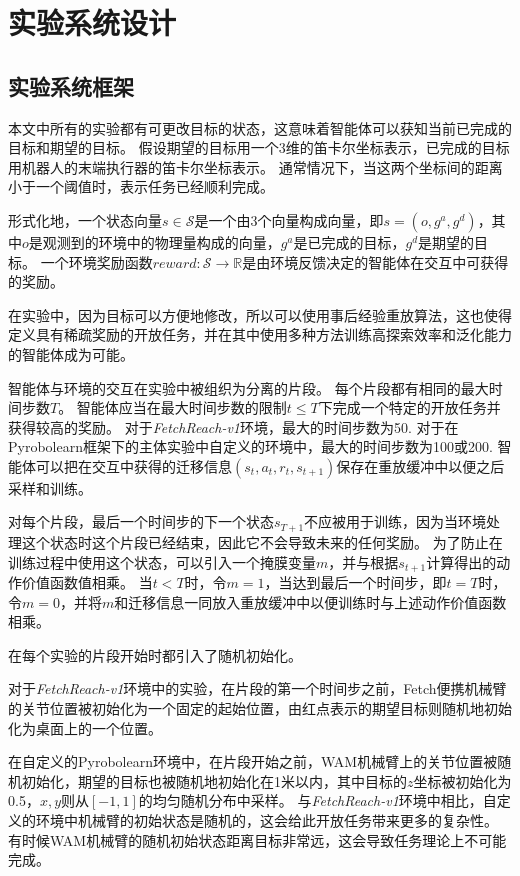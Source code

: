 
\chapter{实验系统设计}

\section{实验系统框架}\label{expframe}
本文中所有的实验都有可更改目标的状态，这意味着智能体可以获知当前已完成的目标和期望的目标。
假设期望的目标用一个3维的笛卡尔坐标表示，已完成的目标用机器人的末端执行器的笛卡尔坐标表示。
通常情况下，当这两个坐标间的距离小于一个阈值时，表示任务已经顺利完成。

形式化地，一个状态向量$s\in\mathcal S$是一个由3个向量构成向量，即$s=(o,g^a,g^d)$，其中$o$是观测到的环境中的物理量构成的向量，$g^a$是已完成的目标，$g^d$是期望的目标。
一个环境奖励函数$reward:\mathcal S\to \mathbb R$是由环境反馈决定的智能体在交互中可获得的奖励。

在实验中，因为目标可以方便地修改，所以可以使用事后经验重放算法，这也使得定义具有稀疏奖励的开放任务，并在其中使用多种方法训练高探索效率和泛化能力的智能体成为可能。

智能体与环境的交互在实验中被组织为分离的片段。
每个片段都有相同的最大时间步数$T$。
智能体应当在最大时间步数的限制$t\leq T$下完成一个特定的开放任务并获得较高的奖励。
对于\emph{FetchReach-v1}环境，最大的时间步数为50.
对于在Pyrobolearn框架下的主体实验中自定义的环境中，最大的时间步数为100或200.
智能体可以把在交互中获得的迁移信息$(s_t,a_t,r_t,s_{t+1})$保存在重放缓冲\cite{DBLP:journals/corr/abs-1906-05253}中以便之后采样和训练。

对每个片段，最后一个时间步的下一个状态$s_{T+1}$不应被用于训练，因为当环境处理这个状态时这个片段已经结束，因此它不会导致未来的任何奖励。
为了防止在训练过程中使用这个状态，可以引入一个掩膜变量$m$，并与根据$s_{t+1}$计算得出的动作价值函数值相乘。
当$t<T$时，令$m=1$，当达到最后一个时间步，即$t=T$时，令$m=0$，并将$m$和迁移信息一同放入重放缓冲中以便训练时与上述动作价值函数相乘。

在每个实验的片段开始时都引入了随机初始化\cite{10.5555/3327546.3327601}。

对于\emph{FetchReach-v1}环境中的实验，在片段的第一个时间步之前，Fetch便携机械臂的关节位置被初始化为一个固定的起始位置，由红点表示的期望目标则随机地初始化为桌面上的一个位置。

在自定义的Pyrobolearn环境中，在片段开始之前，WAM机械臂上的关节位置被随机初始化，期望的目标也被随机地初始化在1米以内，其中目标的$z$坐标被初始化为0.5，$x,y$则从$[-1,1]$的均匀随机分布中采样。
与\emph{FetchReach-v1}环境中相比，自定义的环境中机械臂的初始状态是随机的，这会给此开放任务带来更多的复杂性。
有时候WAM机械臂的随机初始状态距离目标非常远，这会导致任务理论上不可能完成。

